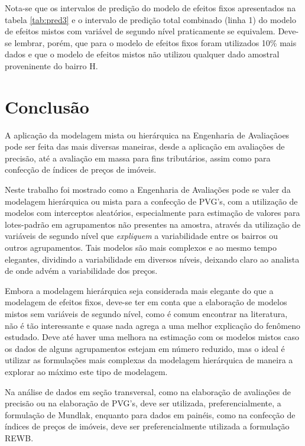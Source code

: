 \documentclass[
  a4paper, 11pt]{article}
\begin{document}
Nota-se que os intervalos de predição do modelo de efeitos fixos
apresentados na tabela \ref{tab:pred3} e o intervalo de predição total
combinado (linha 1) do modelo de efeitos mistos com variável de segundo
nível praticamente se equivalem. Deve-se lembrar, porém, que para o
modelo de efeitos fixos foram utilizados 10\% mais dados e que o modelo
de efeitos mistos não utilizou qualquer dado amostral proveninente do
bairro H.

\hypertarget{conclusuxe3o}{%
\section{Conclusão}\label{conclusuxe3o}}

A aplicação da modelagem mista ou hierárquica na Engenharia de
Avaliaçãoes pode ser feita das mais diversas maneiras, desde a aplicação
em avaliações de precisão, até a avaliação em massa para fins
tributários, assim como para confecção de índices de preços de imóveis.

Neste trabalho foi mostrado como a Engenharia de Avaliações pode se
valer da modelagem hierárquica ou mista para a confecção de PVG's, com a
utilização de modelos com interceptos aleatórios, especialmente para
estimação de valores para lotes-padrão em agrupamentos não presentes na
amostra, através da utilização de variáveis de segundo nível que
\emph{expliquem} a variabilidade entre os bairros ou outros
agrupamentos. Tais modelos são mais complexos e ao mesmo tempo
elegantes, dividindo a variabilidade em diversos níveis, deixando claro
ao analista de onde advém a variabilidade dos preços.

Embora a modelagem hierárquica seja considerada mais elegante do que a
modelagem de efeitos fixos, deve-se ter em conta que a elaboração de
modelos mistos sem variáveis de segundo nível, como é comum encontrar na
literatura, não é tão interessante e quase nada agrega a uma melhor
explicação do fenômeno estudado. Deve até haver uma melhora na estimação
com os modelos mistos caso os dados de alguns agrupamentos estejam em
número reduzido, mas o ideal é utilizar as formulações mais complexas da
modelagem hierárquica de maneira a explorar ao máximo este tipo de
modelagem.

Na análise de dados em seção transversal, como na elaboração de
avaliações de precisão ou na elaboração de PVG's, deve ser utilizada,
preferencialmente, a formulação de Mundlak, enquanto para dados em
painéis, como na confecção de índices de preços de imóveis, deve ser
preferencialmente utilizada a formulação REWB.
\end{document}
